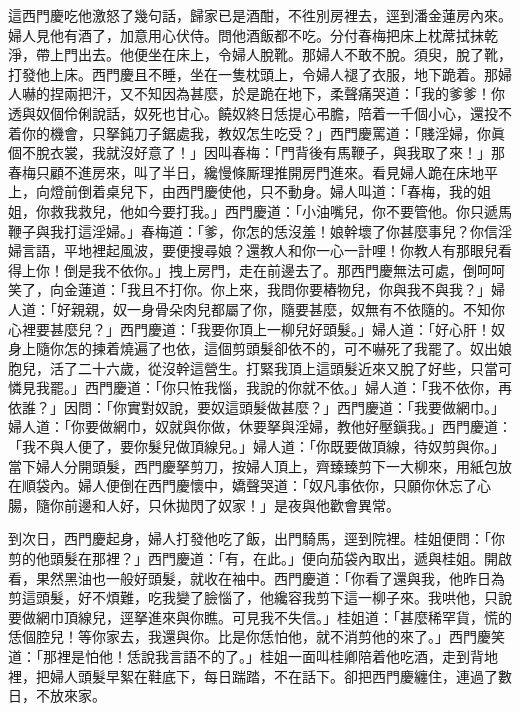這西門慶吃他激怒了幾句話，歸家已是酒酣，不徃別房裡去，逕到潘金蓮房內來。婦人見他有酒了，加意用心伏侍。問他酒飯都不吃。分付春梅把床上枕蓆拭抹乾淨，帶上門出去。他便坐在床上，令婦人脫靴。那婦人不敢不脫。須臾，脫了靴，打發他上床。西門慶且不睡，坐在一隻枕頭上，令婦人褪了衣服，地下跪着。{}那婦人嚇的捏兩把汗，又不知因為甚麼，於是跪在地下，柔聲痛哭道：「我的爹爹！你透與奴個伶俐說話，奴死也甘心。饒奴終日恁提心弔膽，陪着一千個小心，還投不着你的機會，只拏鈍刀子鋸處我，教奴怎生吃受？」西門慶罵道：「賤淫婦，你眞個不脫衣裳，我就沒好意了！」因叫春梅：「門背後有馬鞭子，與我取了來！」{}那春梅只顧不進房來，叫了半日，纔慢條厮理{}推開房門進來。看見婦人跪在床地平上，向燈前倒着桌兒下，由西門慶使他，只不動身。婦人叫道：「春梅，我的姐姐，你救我救兒，他如今要打我。」西門慶道：「小油嘴兒，你不要管他。你只遞馬鞭子與我打這淫婦。」{}春梅道：「爹，你怎的恁沒羞！娘幹壞了你甚麼事兒？你信淫婦言語，平地裡起風波，要便搜尋娘？還教人和你一心一計哩！你教人有那眼兒看得上你！倒是我不依你。」拽上房門，走在前邊去了。那西門慶無法可處，倒呵呵笑了，{}向金蓮道：「我且不打你。你上來，我問你要樁物兒，你與我不與我？」{}婦人道：「好親親，奴一身骨朵肉兒都屬了你，{}隨要甚麼，奴無有不依隨的。不知你心裡要甚麼兒？」西門慶道：「我要你頂上一柳兒好頭髮。」婦人道：「好心肝！奴身上隨你怎的揀着燒遍了也依，這個剪頭髮卻依不的，可不嚇死了我罷了。奴出娘胞兒，活了二十六歲，從沒幹這營生。打緊我頂上這頭髮近來又脫了好些，{}只當可憐見我罷。」西門慶道：「你只恠我惱，我說的你就不依。」婦人道：「我不依你，再依誰？」因問：「你實對奴說，要奴這頭髮做甚麼？」西門慶道：「我要做網巾。」婦人道：「你要做網巾，奴就與你做，休要拏與淫婦，教他好壓鎭我。」西門慶道：「我不與人便了，要你髮兒做頂線兒。」婦人道：「你既要做頂線，待奴剪與你。」當下婦人分開頭髮，西門慶拏剪刀，按婦人頂上，齊臻臻剪下一大柳來，用紙包放在順袋內。{}婦人便倒在西門慶懷中，嬌聲哭道：「奴凡事依你，只願你休忘了心腸，隨你前邊和人好，只休拋閃了奴家！」是夜與他歡會異常。

到次日，西門慶起身，婦人打發他吃了飯，出門騎馬，逕到院裡。桂姐便問：「你剪的他頭髮在那裡？」西門慶道：「有，在此。」便向茄袋內取出，遞與桂姐。開啟看，果然黑油也一般好頭髮，{}就收在袖中。西門慶道：「你看了還與我，他昨日為剪這頭髮，好不煩難，吃我變了臉惱了，他纔容我剪下這一柳子來。我哄他，只說要做網巾頂線兒，逕拏進來與你瞧。可見我不失信。」桂姐道：「甚麼稀罕貨，慌的恁個腔兒！等你家去，我還與你。比是你恁怕他，就不消剪他的來了。」{}西門慶笑道：「那裡是怕他！恁說我言語不的了。」桂姐一面叫桂卿陪着他吃酒，走到背地裡，把婦人頭髮早絮在鞋底下，每日踹踏，{}不在話下。卻把西門慶纏住，連過了數日，不放來家。

